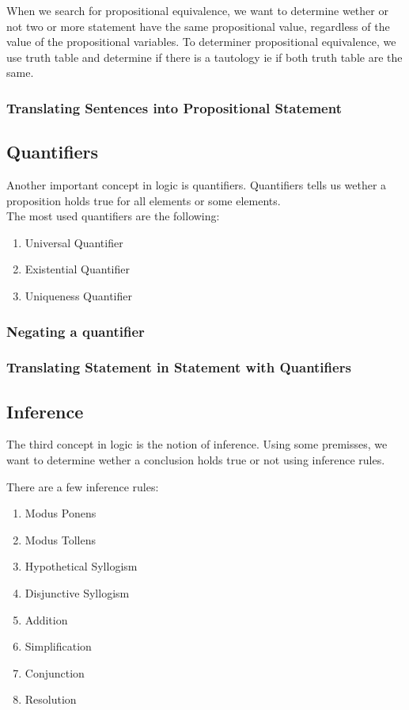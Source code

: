 \documentclass{article}
\begin{document}
When we search for propositional equivalence, we want to determine wether or not
two or more statement have the same propositional value, regardless of the value
of the propositional variables. To determiner propositional equivalence, we use
truth table and determine if there is a tautology ie if both truth table are the
same.

\subsubsection{Translating Sentences into Propositional Statement}

\subsection{Quantifiers}

Another important concept in logic is quantifiers. Quantifiers tells us wether
a proposition holds true for all elements or some elements.\\

The most used quantifiers are the following:

    \begin{enumerate}
	\item Universal Quantifier
	\item Existential Quantifier
	\item Uniqueness Quantifier
    \end{enumerate}

\subsubsection{Negating a quantifier}

\subsubsection{Translating Statement in Statement with Quantifiers}

\subsection{Inference}

The third concept in logic is the notion of inference. Using some premisses,
we want to determine wether a conclusion holds true or not using inference rules.

There are a few inference rules:

    \begin{enumerate}
	\item Modus Ponens
	\item Modus Tollens
	\item Hypothetical Syllogism
	\item Disjunctive Syllogism
	\item Addition
	\item Simplification
	\item Conjunction
	\item Resolution
    \end{enumerate}
\end{document}
